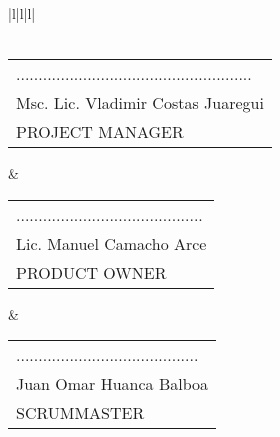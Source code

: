 \begin{minipage}[b]{\hsize}
\begin{tabular}{|l|l|l|}
 \\ \hline
{} \\ \hline
\begin{tabular}[c]{@{}l@{}}.....................................................\\ Msc. Lic. Vladimir Costas Juaregui\\ PROJECT MANAGER\end{tabular} & \begin{tabular}[c]{@{}l@{}}..........................................\\ Lic. Manuel Camacho Arce\\ PRODUCT OWNER\end{tabular} & \begin{tabular}[c]{@{}l@{}}.........................................\\ Juan Omar Huanca Balboa\\ SCRUMMASTER\end{tabular} \\ \hline
\end{tabular}
\label{Tarjeta Historia de Usuario 03}
\end{minipage}

